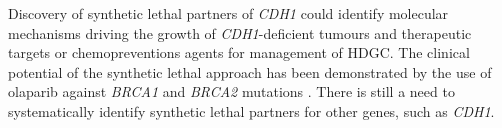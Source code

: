Discovery of \gls{synthetic lethal} partners of \textit{CDH1} could identify molecular mechanisms driving the growth of \textit{CDH1}-deficient \glspl{tumour} and therapeutic targets or \glspl{chemoprevention} agents for management of \gls{HDGC}. The clinical potential of the \gls{synthetic lethal} approach has been demonstrated by the use of olaparib against \textit{BRCA1} and \textit{BRCA2} \glspl{mutation} \citep{Lord2014, McLachlan2016}. There is still a need to systematically identify \gls{synthetic lethal} partners for other genes, such as \textit{CDH1}. 



